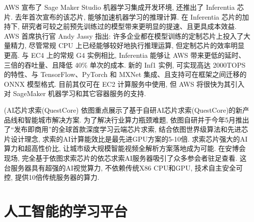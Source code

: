 \begin{example}
AWS 宣布了 Sage Maker Studio 机器学习集成开发环境, 还推出了 Inferentia 芯片.  去年首次宣布的该芯片, 能够加速机器学习的推理计算. 在 Inferentia 芯片的加持下, 研究者可较之前预先训练过的模型带来更明显的提速、且更具成本效益.
AWS 首席执行官 Andy Jassy 指出: 许多企业都在模型训练的定制芯片上投入了大量精力, 尽管常规 CPU 上已经能够较好地执行推理运算, 但定制芯片的效率明显更高.
与 EC4 上的常规 G4 实例相比, Inferentia 能够让 AWS 带来更低的延时、三倍的吞吐量、且降低 40\% 单次的成本.
新的 Inf1 实例, 可实现高达 2000TOPS 的特性、与 TensorFlow、PyTorch 和 MXNet 集成、且支持可在框架之间迁移的 ONNX 模型格式.
目前其仅可在 EC2 计算服务中使用, 但 AWS 将很快为其引入对 SageMaker 机器学习和其它容器服务的支持.
\end{example}
\begin{example}(AI芯片求索(QuestCore)
依图重点展示了基于自研AI芯片求索(QuestCore)的新产品线和智能城市解决方案. 为了解决行业算力瓶颈难题, 依图自研并于今年5月推出了“发布即商用”的全球首款深度学习云端芯片求索, 结合依图世界级算法和先进芯片设计理念, 求索的AI计算能效比是最先进GPU方案的5-10倍.
求索芯片强大的AI算力和超高性价比, 让城市级大规模智能视频全解析方案落地成为可能. 在安博会现场, 完全基于依图求索芯片的依芯求索AI服务器吸引了众多参会者驻足查看. 这台服务器具有超强的AI视觉算力, 不依赖传统X86 CPU和GPU, 技术自主安全可控, 提供10倍传统服务器的算力.
\end{example}
\section{人工智能的学习平台}
